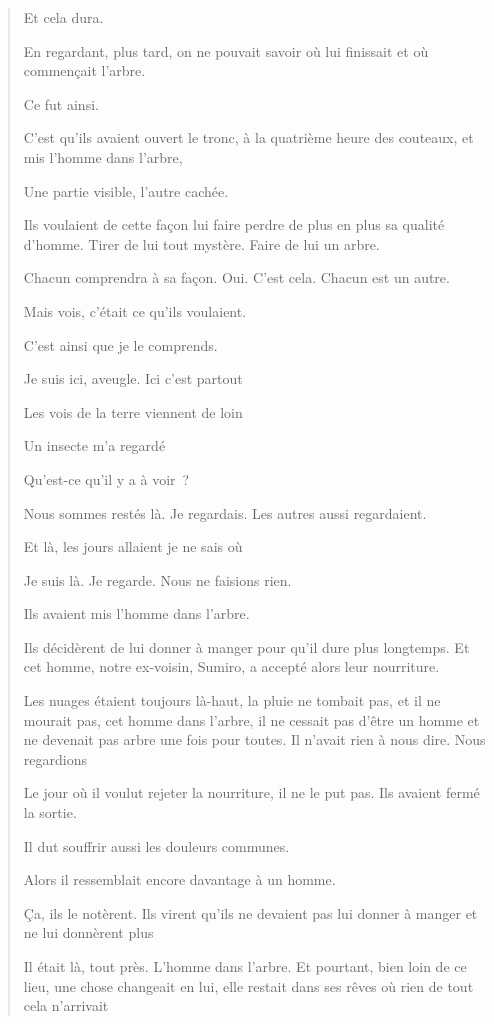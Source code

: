\begin{quote}
Et cela dura.

En regardant, plus tard, on ne pouvait savoir où lui finissait et où
commençait l'arbre.

Ce fut ainsi.

C'est qu'ils avaient ouvert le tronc, à la quatrième heure des couteaux,
et mis l'homme dans l'arbre,

Une partie visible, l'autre cachée.

Ils voulaient de cette façon lui faire perdre de plus en plus sa qualité
d'homme. Tirer de lui tout mystère. Faire de lui un arbre.

Chacun comprendra à sa façon. Oui. C'est cela. Chacun est un autre.

Mais vois, c'était ce qu'ils voulaient.

C'est ainsi que je le comprends.

Je suis ici, aveugle. Ici c'est partout

Les vois de la terre viennent de loin

Un insecte m'a regardé

Qu'est-ce qu'il y a à voir~?

Nous sommes restés là. Je regardais. Les autres aussi regardaient.

Et là, les jours allaient je ne sais où

Je suis là. Je regarde. Nous ne faisions rien.

Ils avaient mis l'homme dans l'arbre.

Ils décidèrent de lui donner à manger pour qu'il dure plus longtemps. Et
cet homme, notre ex-voisin, Sumiro, a accepté alors leur nourriture.

Les nuages étaient toujours là-haut, la pluie ne tombait pas, et il ne
mourait pas, cet homme dans l'arbre, il ne cessait pas d'être un homme
et ne devenait pas arbre une fois pour toutes. Il n'avait rien à nous
dire. Nous regardions

Le jour où il voulut rejeter la nourriture, il ne le put pas. Ils
avaient fermé la sortie.

Il dut souffrir aussi les douleurs communes.

Alors il ressemblait encore davantage à un homme.

Ça, ils le notèrent. Ils virent qu'ils ne devaient pas lui donner à
manger et ne lui donnèrent plus

Il était là, tout près. L'homme dans l'arbre. Et pourtant, bien loin de
ce lieu, une chose changeait en lui, elle restait dans ses rêves où rien
de tout cela n'arrivait


\end{quote}
